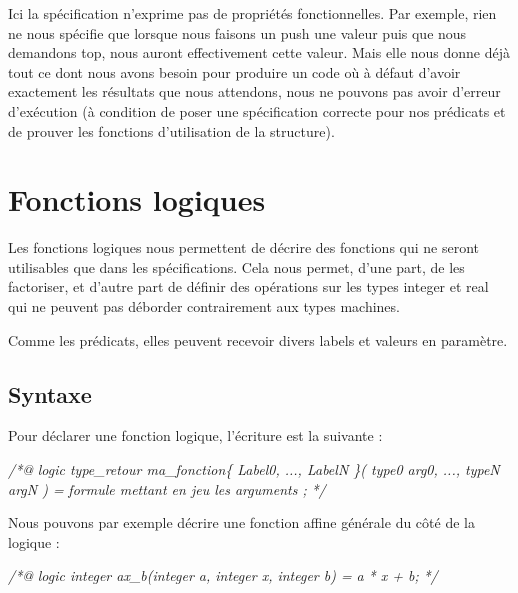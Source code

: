\documentclass[12pt,francais,]{scrbook}
\newenvironment{Shaded}{}{}
\newcommand{\CommentTok}[1]{\textcolor[rgb]{0.38,0.63,0.69}{\textit{{#1}}}}
\begin{document}
Ici la spécification n'exprime pas de propriétés fonctionnelles. Par
exemple, rien ne nous spécifie que lorsque nous faisons un push une
valeur puis que nous demandons top, nous auront effectivement cette
valeur. Mais elle nous donne déjà tout ce dont nous avons besoin pour
produire un code où à défaut d'avoir exactement les résultats que nous
attendons, nous ne pouvons pas avoir d'erreur d'exécution (à condition
de poser une spécification correcte pour nos prédicats et de prouver les
fonctions d'utilisation de la structure).

\section{Fonctions logiques}\label{fonctions-logiques}

Les fonctions logiques nous permettent de décrire des fonctions qui ne
seront utilisables que dans les spécifications. Cela nous permet, d'une
part, de les factoriser, et d'autre part de définir des opérations sur
les types integer et real qui ne peuvent pas déborder contrairement aux
types machines.

Comme les prédicats, elles peuvent recevoir divers labels et valeurs en
paramètre.

\newpage
\subsection{Syntaxe}\label{syntaxe-1}

Pour déclarer une fonction logique, l'écriture est la suivante :

\begin{footnotesize}\begin{Shaded}
\begin{Highlighting}[]
\CommentTok{/*@}
\CommentTok{  logic type_retour ma_fonction\{ Label0, ..., LabelN \}( type0 arg0, ..., typeN argN ) =}
\CommentTok{    formule mettant en jeu les arguments ;}
\CommentTok{*/}
\end{Highlighting}
\end{Shaded}\end{footnotesize}

Nous pouvons par exemple décrire une fonction affine générale du côté de
la logique :

\begin{footnotesize}\begin{Shaded}
\begin{Highlighting}[]
\CommentTok{/*@}
\CommentTok{  logic integer ax_b(integer a, integer x, integer b) =}
\CommentTok{    a * x + b;}
\CommentTok{*/}
\end{Highlighting}
\end{Shaded}\end{footnotesize}
\end{document}
